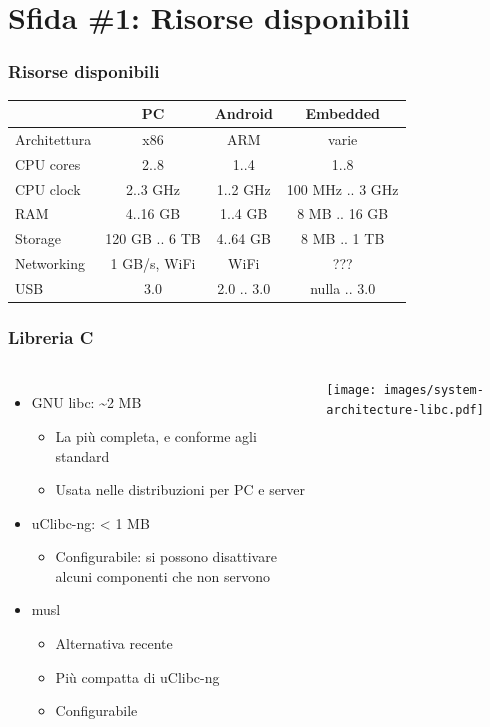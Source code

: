 \documentclass[xetex,table]{beamer}
\begin{document}
\section{Sfida \#1: Risorse disponibili}

\begin{frame}
\frametitle{Risorse disponibili}
{
  \begin{tabular}{ |l|c|c|c|  }
    \hline
     & PC & Android & Embedded \\
    \hline
    Architettura & x86            & ARM        & varie            \\
    CPU cores    & 2..8           & 1..4       & 1..8             \\
    CPU clock    & 2..3 GHz       & 1..2 GHz   & 100 MHz .. 3 GHz \\
    RAM          & 4..16 GB       & 1..4 GB    & 8 MB .. 16 GB    \\
    Storage      & 120 GB .. 6 TB & 4..64 GB   & 8 MB .. 1 TB     \\
    Networking   & 1 GB/s, WiFi   & WiFi       & ???              \\
    USB          & 3.0            & 2.0 .. 3.0 & nulla .. 3.0     \\
    \hline
  \end{tabular}
}
\end{frame}

\begin{frame}
\frametitle{Libreria C}
  \begin{columns}
    \begin{itemize}
      \item GNU libc: \textasciitilde 2 MB
      \begin{itemize}
        \item La più completa, e conforme agli standard
        \item Usata nelle distribuzioni per PC e server
      \end{itemize}
      \item uClibc-ng: < 1 MB
      \begin{itemize}
        \item Configurabile: si possono disattivare alcuni componenti
          che non servono
      \end{itemize}
      \item musl
      \begin{itemize}
        \item Alternativa recente
        \item Più compatta di uClibc-ng
        \item Configurabile
      \end{itemize}
    \end{itemize}
    \texttt{[image: images/system-architecture-libc.pdf]}
  \end{columns}
\end{frame}
\end{document}
